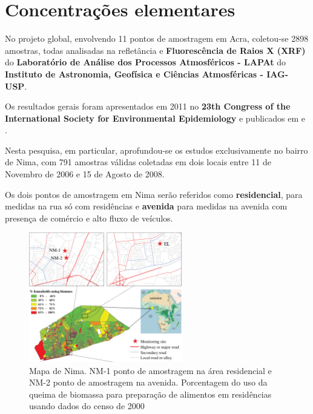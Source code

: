 \section{Concentrações elementares}

No projeto global, envolvendo 11 pontos de amostragem em Acra, 
coletou-se 2898 amostras, todas analisadas na refletância e 
\textbf{Fluorescência de Raios X (XRF)} do 
\textbf{Laboratório de Análise dos Processos Atmosféricos - LAPAt} 
do \textbf{Instituto de Astronomia, Geofísica e Ciências Atmosféricas - IAG-USP}.

Os resultados gerais foram apresentados em 2011 no
\textbf{23th Congress of the International Society for Environmental 
Epidemiology} \citep{zhou2011} e publicados em \citep{zhou2013} e \citep{zhou2014}. 

Nesta pesquisa, em particular, aprofundou-se os estudos exclusivamente no bairro de Nima, 
com 791 amostras válidas coletadas em dois locais entre 11 de 
Novembro de 2006 e 15 de Agosto de 2008.

Os dois pontos de amostragem em Nima serão referidos como \textbf{residencial},
para medidas na rua só com residências e \textbf{avenida} para medidas na avenida
com presença de comércio e alto fluxo de veículos.

\begin{figure}[H]
\begin{center}
  \includegraphics[width=0.6\textwidth]{../inputs/images/zheng/nima_mapa.pdf}
  \caption{Mapa de Nima. NM-1 ponto de amostragem na área residencial e 
           NM-2 ponto de amostragem na avenida. Porcentagem do uso da queima
           de biomassa para preparação de alimentos em residências usando dados
           do censo de 2000 \citep{ghanacensus2003} \label{fig:nima_mapa}}
\end{center}
\end{figure}


